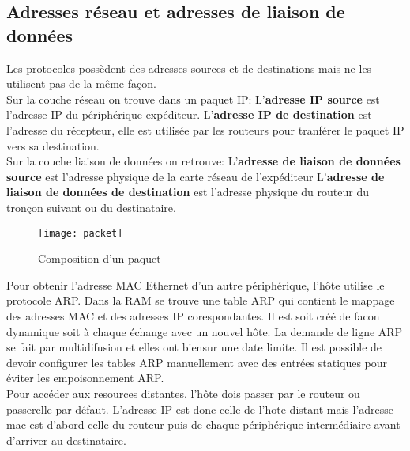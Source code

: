  \subsection{Adresses réseau et adresses de liaison de données}
 Les protocoles possèdent des adresses sources et de destinations mais ne les utilisent pas de la même façon.\\
 \indent
 Sur la couche réseau on trouve dans un paquet IP\@:
 \indent
 L'\textbf{adresse IP source} est l'adresse IP du périphérique expéditeur.
 \indent
 L'\textbf{adresse IP de destination} est l'adresse du récepteur, elle est utilisée par les routeurs pour tranférer le paquet IP vers sa destination.\\

 \indent
 Sur la couche liaison de données on retrouve:
 \indent
 L'\textbf{adresse de liaison de données source} est l'adresse physique de la carte réseau de l'expéditeur
 \indent
 L'\textbf{adresse de liaison de données de destination} est l'adresse physique du routeur du tronçon suivant ou du destinataire.\\

 \indent
 \begin{figure}[h]
	 \centering
	 \texttt{[image: packet]}
	 \caption{Composition d'un paquet}
 \end{figure}
 Pour obtenir l'adresse MAC Ethernet d'un autre périphérique, l'hôte utilise le protocole ARP\@. Dans la RAM se trouve une table ARP qui contient le mappage des adresses MAC et des adresses IP corespondantes. Il est soit créé de facon dynamique soit à chaque échange avec un nouvel hôte. La demande de ligne ARP se fait par multidifusion et elles ont biensur une date limite.
 \indent
 Il est possible de devoir configurer les tables ARP manuellement avec des entrées statiques pour éviter les empoisonnement ARP\@.\\

 \indent
 Pour accéder aux resources distantes, l'hôte dois passer par le routeur ou passerelle par défaut. L'adresse IP est donc celle de l'hote distant mais l'adresse mac est d'abord celle du routeur puis de chaque périphérique intermédiaire avant d'arriver au destinataire.





